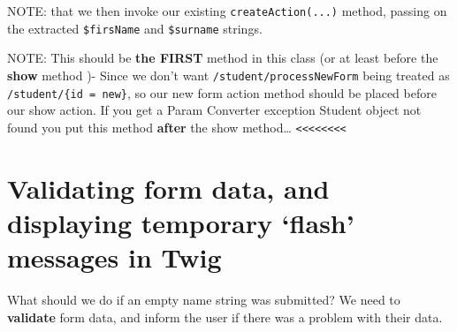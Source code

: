 \documentclass[a4paperpaper,openright]{book}
\newenvironment{Shaded}{}{}
\newcommand{\AnnotationTok}[1]{\textcolor[rgb]{0.38,0.63,0.69}{\textbf{\textit{#1}}}}
\newcommand{\CommentTok}[1]{\textcolor[rgb]{0.38,0.63,0.69}{\textit{#1}}}
\newcommand{\KeywordTok}[1]{\textcolor[rgb]{0.00,0.44,0.13}{\textbf{#1}}}
\newcommand{\NormalTok}[1]{#1}
\newcommand{\OtherTok}[1]{\textcolor[rgb]{0.00,0.44,0.13}{#1}}
\newcommand{\StringTok}[1]{\textcolor[rgb]{0.25,0.44,0.63}{#1}}
\begin{document}
\begin{Shaded}
\end{Shaded}

NOTE: that we then invoke our existing \texttt{createAction(...)}
method, passing on the extracted \texttt{\$firsName} and
\texttt{\$surname} strings.

NOTE: This should be \textbf{the FIRST} method in this class (or at
least before the \textbf{show} method )- Since we don't want
\texttt{/student/processNewForm} being treated as
\texttt{/student/\{id\ =\ \textquotesingle{}new\textquotesingle{}\}}, so
our new form action method should be placed before our show action. If
you get a Param Converter exception Student object not found you put
this method \textbf{after} the show method\ldots{}
\texttt{\textless{}\textless{}\textless{}\textless{}\textless{}\textless{}\textless{}\textless{}}

\hypertarget{validating-form-data-and-displaying-temporary-flash-messages-in-twig}{%
\section{Validating form data, and displaying temporary `flash' messages
in
Twig}\label{validating-form-data-and-displaying-temporary-flash-messages-in-twig}}

What should we do if an empty name string was submitted? We need to
\textbf{validate} form data, and inform the user if there was a problem
with their data.
\end{document}
